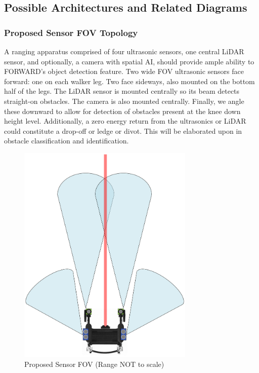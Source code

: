 \subsection{Possible Architectures and Related Diagrams}

\subsubsection{Proposed Sensor FOV Topology}
\noindent A ranging apparatus comprised of four ultrasonic sensors, one central LiDAR sensor, and optionally, a camera with spatial AI, should provide ample ability to FORWARD's object detection feature. Two wide FOV ultrasonic sensors face forward: one on each walker leg. Two face sideways, also mounted on the bottom half of the legs. The LiDAR sensor is mounted centrally so its beam detects straight-on obstacles. The camera is also mounted centrally. Finally, we angle these downward to allow for detection of obstacles present at the knee down height level. Additionally, a zero energy return from the ultrasonics or LiDAR could constitute a drop-off or ledge or divot. This will be elaborated upon in obstacle classification and identification.\\

\begin{figure}[H]
	\centering
	\includegraphics[angle=90,width=0.75\textwidth]{./Images/propose-sensorFOV.png}
	\caption{\label{fig:proposedsensorFOV}Proposed Sensor FOV (Range NOT to scale)}
\end{figure}


